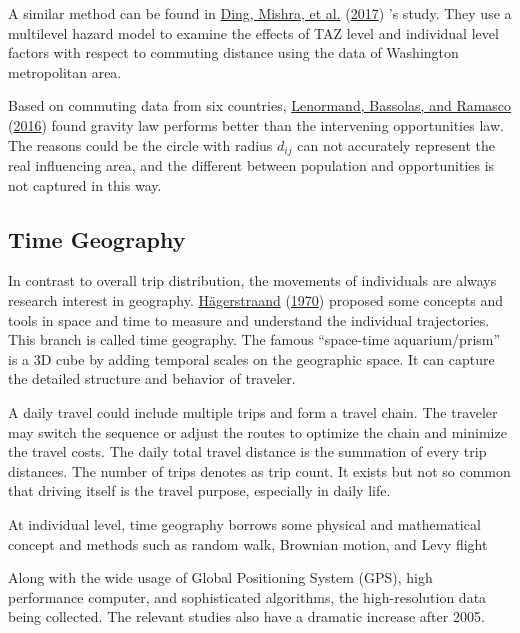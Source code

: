 \documentclass[
  11pt,
  openany]{memoir}
\begin{document}
A similar method can be found in \protect\hyperlink{ref-dingInfluencesBuiltEnvironment2017}{Ding, Mishra, et al.} (\protect\hyperlink{ref-dingInfluencesBuiltEnvironment2017}{2017}) 's study. They use a multilevel hazard model to examine the effects of TAZ level and individual level factors with respect to commuting distance using the data of Washington metropolitan area.

Based on commuting data from six countries, \protect\hyperlink{ref-lenormandSystematicComparisonTrip2016}{Lenormand, Bassolas, and Ramasco} (\protect\hyperlink{ref-lenormandSystematicComparisonTrip2016}{2016}) found gravity law performs better than the intervening opportunities law. The reasons could be the circle with radius \(d_{ij}\) can not accurately represent the real influencing area, and the different between population and opportunities is not captured in this way.

\hypertarget{time-geography}{%
\subsection{Time Geography}\label{time-geography}}

In contrast to overall trip distribution, the movements of individuals are always research interest in geography. \protect\hyperlink{ref-hagerstraandWhatPeopleRegional1970}{Hägerstraand} (\protect\hyperlink{ref-hagerstraandWhatPeopleRegional1970}{1970}) proposed some concepts and tools in space and time to measure and understand the individual trajectories. This branch is called time geography. The famous ``space-time aquarium/prism'' is a 3D cube by adding temporal scales on the geographic space. It can capture the detailed structure and behavior of traveler.

A daily travel could include multiple trips and form a travel chain. The traveler may switch the sequence or adjust the routes to optimize the chain and minimize the travel costs. The daily total travel distance is the summation of every trip distances. The number of trips denotes as trip count. It exists but not so common that driving itself is the travel purpose, especially in daily life.

At individual level, time geography borrows some physical and mathematical concept and methods such as random walk, Brownian motion, and Levy flight

Along with the wide usage of Global Positioning System (GPS), high performance computer, and sophisticated algorithms, the high-resolution data being collected. The relevant studies also have a dramatic increase after 2005.
\end{document}
